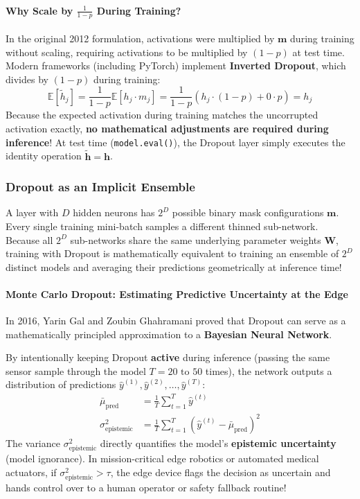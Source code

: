 \paragraph{Why Scale by $\frac{1}{1 - p}$ During Training?}
In the original 2012 formulation, activations were multiplied by $\mathbf{m}$ during training without scaling, requiring activations to be multiplied by $(1 - p)$ at test time. Modern frameworks (including PyTorch) implement \textbf{Inverted Dropout}, which divides by $(1 - p)$ during training:
\begin{equation}
\mathbb{E}[\tilde{h}_j] = \frac{1}{1 - p} \mathbb{E}[h_j \cdot m_j] = \frac{1}{1 - p} \left( h_j \cdot (1 - p) + 0 \cdot p \right) = h_j\label{eq:dropout_expectation}
\end{equation}
Because the expected activation during training matches the uncorrupted activation exactly, \textbf{no mathematical adjustments are required during inference}! At test time (\texttt{model.eval()}), the Dropout layer simply executes the identity operation $\tilde{\mathbf{h}} = \mathbf{h}$.

\subsubsection{Dropout as an Implicit Ensemble}

A layer with $D$ hidden neurons has $2^D$ possible binary mask configurations $\mathbf{m}$. Every single training mini-batch samples a different thinned sub-network. Because all $2^D$ sub-networks share the same underlying parameter weights $\mathbf{W}$, training with Dropout is mathematically equivalent to training an ensemble of $2^D$ distinct models and averaging their predictions geometrically at inference time!

\paragraph{Monte Carlo Dropout: Estimating Predictive Uncertainty at the Edge}
In 2016, Yarin Gal and Zoubin Ghahramani proved that Dropout can serve as a mathematically principled approximation to a \textbf{Bayesian Neural Network}.

By intentionally keeping Dropout \textbf{active} during inference (passing the same sensor sample through the model $T = 20\text{ to }50$ times), the network outputs a distribution of predictions $\hat{y}^{(1)}, \hat{y}^{(2)}, \dots, \hat{y}^{(T)}$:
\begin{align}
\bar{\mu}_{\text{pred}} &= \frac{1}{T}\sum_{t=1}^T \hat{y}^{(t)}\label{eq:mc_mean} \\
\sigma^2_{\text{epistemic}} &= \frac{1}{T}\sum_{t=1}^T \left( \hat{y}^{(t)} - \bar{\mu}_{\text{pred}} \right)^2\label{eq:mc_var}
\end{align}
The variance $\sigma^2_{\text{epistemic}}$ directly quantifies the model's \textbf{epistemic uncertainty} (model ignorance). In mission-critical edge robotics or automated medical actuators, if $\sigma^2_{\text{epistemic}} > \tau$, the edge device flags the decision as uncertain and hands control over to a human operator or safety fallback routine!

